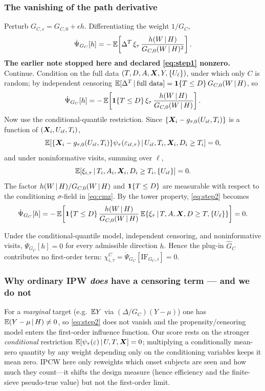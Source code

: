 \subsubsection{The vanishing of the path derivative}
Perturb $G_{C,\epsilon}=G_{C,0}+\epsilon h$. Differentiating the weight
$1/G_C$,
\begin{equation}
\dot\Psi_{G_C}[h]
=-\,\mathbb{E}\!\left[\Delta^T\,\xi_\tau\,
   \frac{h(W\,\vert\, H)}{G_{C,0}(W\,\vert\, H)^2}\right].
\label{eq:step1}
\end{equation}
\textbf{The earlier note stopped here and declared \eqref{eq:step1} nonzero.}
Continue. Condition on the full data $(T,D,A,\bm{X},Y,\{U_\ell\})$, under which only
$C$ is random; by independent censoring
$\mathbb{E}[\Delta^T\,\vert\,\text{full data}]=\mathbf{1}\{T\le D\}\,G_{C,0}(W\,\vert\, H)$, so
\begin{equation}
\dot\Psi_{G_C}[h]
=-\,\mathbb{E}\!\left[\mathbf{1}\{T\le D\}\,\xi_\tau\,
   \frac{h(W\,\vert\, H)}{G_{C,0}(W\,\vert\, H)}\right].
\label{eq:step2}
\end{equation}
Now use the conditional-quantile restriction. Since
$\{\bm{X}_i-g_{\tau,0}(U_{i\ell},T_i)\}$ is a function of $(\bm{X}_i,U_{i\ell},T_i)$,
\[
\mathbb{E}[\{\bm{X}_i-g_{\tau,0}(U_{i\ell},T_i)\}\psi_\tau(\varepsilon_{i\ell,\tau})
   \,\vert\, U_{i\ell},T_i,\bm{X}_i,D_i\ge T_i]=0,
\]
and under noninformative visits, summing over $\ell$,
\begin{equation}
\mathbb{E}[\xi_{i,\tau}\,\vert\, T_i,A_i,\bm{X}_i,D_i\ge T_i,\{U_{i\ell}\}]=0.
\label{eq:cmz}
\end{equation}
The factor $h(W\,\vert\, H)/G_{C,0}(W\,\vert\, H)$ and $\mathbf{1}\{T\le D\}$ are measurable
with respect to the conditioning $\sigma$-field in \eqref{eq:cmz}. By the tower
property, \eqref{eq:step2} becomes
\[
\dot\Psi_{G_C}[h]
=-\,\mathbb{E}\!\left[\mathbf{1}\{T\le D\}\,\frac{h(W\,\vert\, H)}{G_{C,0}(W\,\vert\, H)}\,
   \mathbb{E}\{\xi_\tau\,\vert\, T,A,\bm{X},D\ge T,\{U_\ell\}\}\right]=0.
\]
\begin{lemma}\label{lem:orth}
Under the conditional-quantile model, independent censoring, and noninformative
visits, $\dot\Psi_{G_C}[h]=0$ for every admissible direction $h$. Hence the
plug-in $\widehat G_C$ contributes no first-order term:
$\chi^C_{i,\tau}=\dot\Psi_{G_C}[\mathrm{IF}_{G_C,i}]=0$.
\end{lemma}

\subsubsection{Why ordinary IPW \emph{does} have a censoring term --- and we do not}
For a \emph{marginal} target (e.g.\ $\mathbb{E} Y$ via $(\Delta/G_C)(Y-\mu)$) one has
$\mathbb{E}(Y-\mu\,\vert\, H)\neq0$, so \eqref{eq:step2} does not vanish and the
propensity/censoring model enters the first-order influence function. Our score
rests on the stronger \emph{conditional} restriction
$\mathbb{E}[\psi_\tau(\varepsilon)\,\vert\, U,T,\bm{X}]=0$; multiplying a conditionally
mean-zero quantity by any weight depending only on the conditioning variables
keeps it mean zero. IPCW here only reweights which onset subjects are seen and
how much they count---it shifts the design measure (hence efficiency and the
finite-sieve pseudo-true value) but not the first-order limit.

